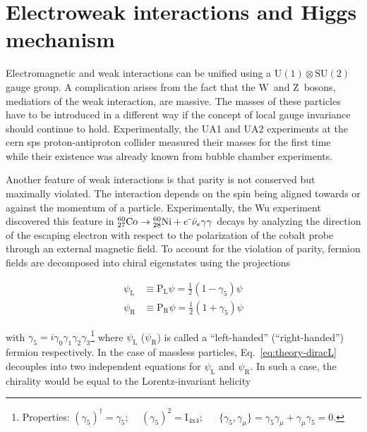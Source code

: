 \section{Electroweak interactions and Higgs mechanism}
\label{sec:theory-ewk}

Electromagnetic and weak interactions can be unified using a $\mathrm{U(1)}\otimes \mathrm{SU(2)}$ gauge group. A complication arises from the fact that the $\mathrm{W}$~and $\mathrm{Z}$~bosons, mediatiors of the weak interaction, are massive. The masses of these particles have to be introduced in a different way if the concept of local gauge invariance should continue to hold. Experimentally, the UA1 and UA2 experiments at the \gls{cern} \gls{sps} proton-antiproton collider measured their masses for the first time~\cite{Arnison:1983rp,Banner:1983jy,Arnison:1983mk,Bagnaia:1983zx} while their existence was already known from bubble chamber experiments.

Another feature of weak interactions is that parity is not conserved but maximally violated. The interaction depends on the spin being aligned towards or against the momentum of a particle. Experimentally, the Wu experiment~\cite{PhysRev.105.1413} discovered this feature in ${}_{27}^{60}\mathrm{Co}\to{}_{28}^{60}\mathrm{Ni}+e^{\rmminus}\bar{\nu}_{e}\gamma\gamma$ decays by analyzing the direction of the escaping electron with respect to the polarization of the cobalt probe through an external magnetic field. To account for the violation of parity, fermion fields are decomposed into chiral eigenstates using the projections

\begin{align}
\psi_\mathrm{L}&\equiv\mathrm{P}_\mathrm{L}\psi=\tfrac{1}{2}(1-\gamma_{5})\psi \\
\psi_\mathrm{R}&\equiv\mathrm{P}_\mathrm{R}\psi=\tfrac{1}{2}(1+\gamma_{5})\psi
\end{align}

with $\gamma_{5}=i\gamma_{0}\gamma_{1}\gamma_{2}\gamma_{3}$\footnote{Properties: $(\gamma_{5})^{\dagger}=\gamma_{5}$; ~~$(\gamma_{5})^2=\mathrm{I}_\mathrm{4x4}$; ~~ $\{\gamma_{5},\gamma_{\mu}\}=\gamma_{5}\gamma_{\mu}+\gamma_{\mu}\gamma_{5}=0$.} where $\psi_\mathrm{L}$ ($\psi_\mathrm{R}$) is called a ``left-handed'' (``right-handed'') fermion respectively. In the case of massless particles, Eq.~\ref{eq:theory-diracL} decouples into two independent equations for $\psi_\mathrm{L}$ and $\psi_\mathrm{R}$. In such a case, the chirality would be equal to the Lorentz-invariant helicity

